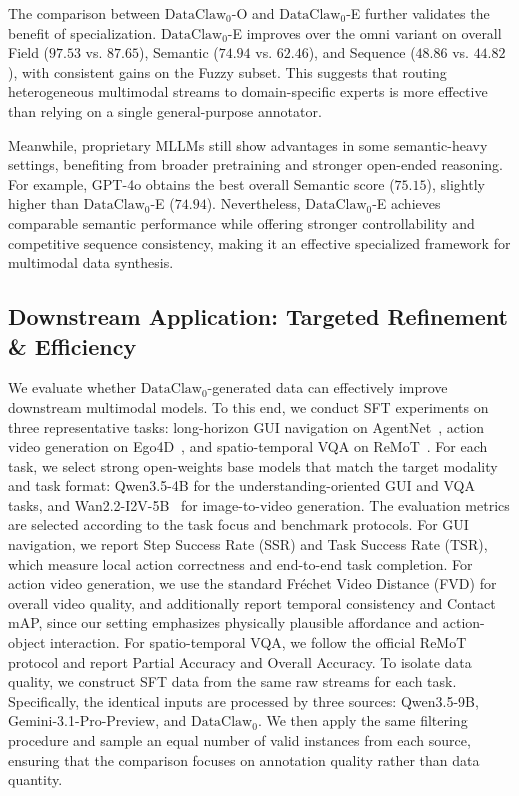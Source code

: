 The comparison between $\text{DataClaw}_0$-O and $\text{DataClaw}_0$-E further validates the benefit of specialization. $\text{DataClaw}_0$-E improves over the omni variant on overall Field (\(97.53\) vs. \(87.65\)), Semantic (\(74.94\) vs. \(62.46\)), and Sequence (\(48.86\) vs. \(44.82\)), with consistent gains on the Fuzzy subset. This suggests that routing heterogeneous multimodal streams to domain-specific experts is more effective than relying on a single general-purpose annotator.

Meanwhile, proprietary MLLMs still show advantages in some semantic-heavy settings, benefiting from broader pretraining and stronger open-ended reasoning. For example, GPT-4o obtains the best overall Semantic score (\(75.15\)), slightly higher than $\text{DataClaw}_0$-E (\(74.94\)). Nevertheless, $\text{DataClaw}_0$-E achieves comparable semantic performance while offering stronger controllability and competitive sequence consistency, making it an effective specialized framework for multimodal data synthesis.




\subsection{Downstream Application: Targeted Refinement \& Efficiency }
\label{sec:downstream_application}

We evaluate whether $\text{DataClaw}_0$-generated data can effectively improve downstream multimodal models. To this end, we conduct SFT experiments on three representative tasks: long-horizon GUI navigation on AgentNet~\cite{wang2025opencua}, action video generation on Ego4D~\cite{grauman2022ego4d}, and spatio-temporal VQA on ReMoT~\cite{remot}. 
For each task, we select strong open-weights base models that match the target modality and task format: Qwen3.5-4B for the understanding-oriented GUI and VQA tasks, and Wan2.2-I2V-5B~\cite{wan2025} for image-to-video generation. The evaluation metrics are selected according to the task focus and benchmark protocols. For GUI navigation, we report Step Success Rate (SSR) and Task Success Rate (TSR), which measure local action correctness and end-to-end task completion. For action video generation, we use the standard Fréchet Video Distance (FVD) for overall video quality, and additionally report temporal consistency and Contact mAP, since our setting emphasizes physically plausible affordance and action-object interaction. For spatio-temporal VQA, we follow the official ReMoT protocol and report Partial Accuracy and Overall Accuracy.
To isolate data quality, we construct SFT data from the same raw streams for each task. Specifically, the identical inputs are processed by three sources: Qwen3.5-9B, Gemini-3.1-Pro-Preview, and $\text{DataClaw}_0$. We then apply the same filtering procedure and sample an equal number of valid instances from each source, ensuring that the comparison focuses on annotation quality rather than data quantity.

